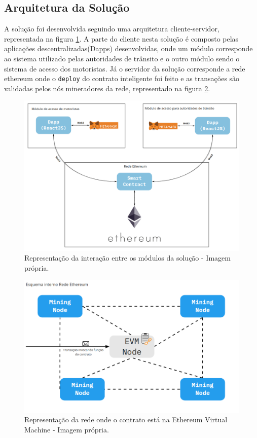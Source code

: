         
\subsection{Arquitetura da Solução}

A solução foi desenvolvida seguindo uma arquitetura cliente-servidor, representada na figura \ref{fig:dapp_arquitetura_solucao}. A parte do cliente nesta solução é composto pelas aplicações descentralizadas(Dapps) desenvolvidas, onde um módulo corresponde ao sistema utilizado pelas autoridades de trânsito e o outro módulo sendo o sistema de acesso dos motoristas. Já o servidor da solução corresponde a rede ethereum onde o \verb|deploy| do contrato inteligente foi feito e as transações são validadas pelos nós mineradores da rede, representado na figura \ref{fig:dapp_rede_ethereum}.

    \begin{figure}[h]
         \centering
         \includegraphics[scale=0.35]{figuras/capitulo_5/arquitetura_solucao.png}
         \caption{Representação da interação entre os módulos da solução - Imagem própria.}
         \label{fig:dapp_arquitetura_solucao}
    \end{figure}
                                                        
    \begin{figure}[h]
         \centering
         \includegraphics[scale=0.4]{figuras/capitulo_5/esquema_rede_ethereum.png}
         \caption{Representação da rede onde o contrato está na Ethereum Virtual Machine - Imagem própria.}
         \label{fig:dapp_rede_ethereum}
    \end{figure}
    
